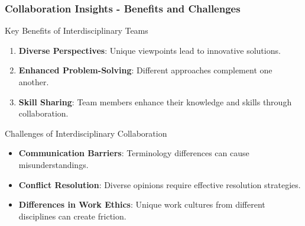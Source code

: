 \documentclass[aspectratio=169]{beamer}
\begin{document}
\begin{frame}[fragile]
    \frametitle{Collaboration Insights - Benefits and Challenges}
    \begin{block}{Key Benefits of Interdisciplinary Teams}
        \begin{enumerate}
            \item \textbf{Diverse Perspectives}: Unique viewpoints lead to innovative solutions.
            \item \textbf{Enhanced Problem-Solving}: Different approaches complement one another.
            \item \textbf{Skill Sharing}: Team members enhance their knowledge and skills through collaboration.
        \end{enumerate}
    \end{block}
    
    \begin{block}{Challenges of Interdisciplinary Collaboration}
        \begin{itemize}
            \item \textbf{Communication Barriers}: Terminology differences can cause misunderstandings.
            \item \textbf{Conflict Resolution}: Diverse opinions require effective resolution strategies.
            \item \textbf{Differences in Work Ethics}: Unique work cultures from different disciplines can create friction.
        \end{itemize}
    \end{block}
\end{frame}
\end{document}
